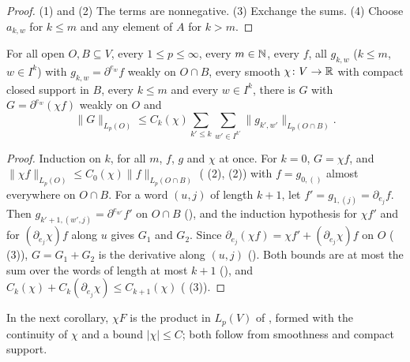 \begin{proof}
\leanok
(1) and (2) The terms are nonnegative. (3) Exchange the sums. (4) Choose $a_{k,w}$ for $k \leq m$
and any element of $A$ for $k > m$.
\end{proof}

\begin{theorem}
\label{thm:leibniz-rule}
\leanok
{}
For all open $O, B \subseteq V$, every $1 \leq p \leq \infty$, every $m \in \mathbb{N}$, every $f$, all
$g_{k,w}$ ($k \leq m$, $w \in I^k$) with $g_{k,w} = \partial^{e_w} f$ weakly on $O \cap B$, every
smooth $\chi \colon V \to \mathbb{R}$ with compact closed support in $B$, every $k \leq m$ and every
$w \in I^k$, there is $G$ with $G = \partial^{e_w} (\chi f)$ weakly on $O$ and
\[
  \|G\|_{L_p(O)} \leq C_k(\chi) \sum_{k' \leq k} \sum_{w' \in I^{k'}}
    \|g_{k',w'}\|_{L_p(O \cap B)} .
\]
\end{theorem}

\begin{proof}
\leanok
Induction on $k$, for all $m$, $f$, $g$ and $\chi$ at once. For $k = 0$, $G = \chi f$, and
$\|\chi f\|_{L_p(O)} \leq C_0(\chi) \|f\|_{L_p(O \cap B)}$
( (2),  (2)) with $f = g_{0,()}$
almost everywhere on $O \cap B$. For a word $(u, j)$ of length $k + 1$, let
$f' = g_{1,(j)} = \partial_{e_j} f$. Then $g_{k'+1,(w', j)} = \partial^{e_{w'}} f'$ on $O \cap B$
(), and the induction hypothesis for $\chi f'$ and for
$(\partial_{e_j} \chi) f$ along $u$ gives $G_1$ and $G_2$. Since
$\partial_{e_j} (\chi f) = \chi f' + (\partial_{e_j} \chi) f$ on $O$
( (3)), $G = G_1 + G_2$ is the derivative along $(u, j)$
(). Both bounds are at most the sum over the words of length at most
$k + 1$ (), and
$C_k(\chi) + C_k(\partial_{e_j} \chi) \leq C_{k+1}(\chi)$ ( (3)).
\end{proof}

In the next corollary, $\chi F$ is the product in $L_p(V)$ of , formed
with the continuity of $\chi$ and a bound $|\chi| \leq C$; both follow from smoothness and compact
support.

